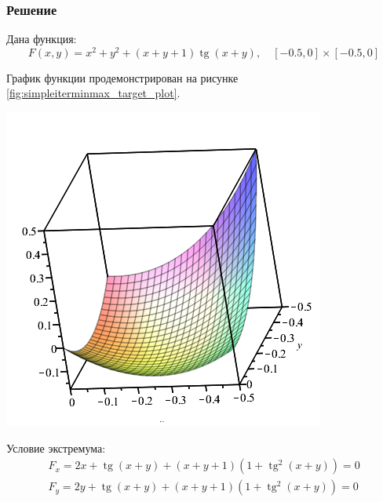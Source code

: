 \documentclass[a4paper, fontsize=14pt]{article}
\begin{document}
\subsubsection*{Решение}

Дана функция:
\begin{equation}
    \label{eq:simpleiterminmax_target}
    F(x,y) = x^2 + y^2 + (x+y+1) \operatorname{tg} (x+y), \quad [-0.5, 0] \times [-0.5, 0]
\end{equation}

График функции продемонстрирован на рисунке \ref{fig:simpleiterminmax_target_plot}.

\begin{center}
    \includegraphics[scale=0.5]{src/simple iter sys target.png}
    \label{fig:simpleiterminmax_target_plot}
\end{center}

Условие экстремума:
\begin{equation}
    \label{eq:exstr_condition}
    \begin{aligned}
        F_x =  2 x + \operatorname{tg}(x+y) + (x+y+1) (1 + \operatorname{tg}^2 (x+y)) = 0 \\
        F_y =  2 y + \operatorname{tg}(x+y) + (x+y+1) (1 + \operatorname{tg}^2 (x+y)) = 0\\
    \end{aligned}
\end{equation}
\end{document}
